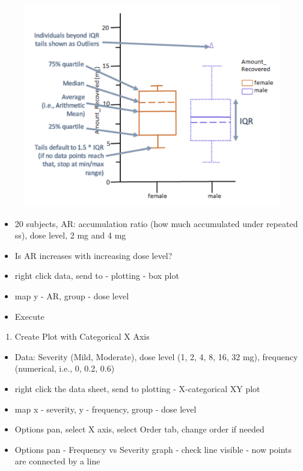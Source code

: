 \documentclass[
  letterpaper,
  DIV=11,
  numbers=noendperiod]{scrreprt}
\providecommand{\tightlist}{%
  \setlength{\itemsep}{0pt}\setlength{\parskip}{0pt}}\usepackage{longtable,booktabs,array}
\begin{document}
\begin{figure}

{\centering \includegraphics[width=4.5625in,height=\textheight]{./images/image-40592419.png}

}

\end{figure}

\begin{itemize}
\tightlist
\item
  20 subjects, AR: accumulation ratio (how much accumulated under
  repeated ss), dose level, 2 mg and 4 mg
\item
  Is AR increases with increasing dose level?
\item
  right click data, send to - plotting - box plot
\item
  map y - AR, group - dose level
\item
  Execute
\end{itemize}

\begin{enumerate}
\def\labelenumi{\arabic{enumi}.}
\setcounter{enumi}{7}
\tightlist
\item
  Create Plot with Categorical X Axis
\end{enumerate}

\begin{itemize}
\tightlist
\item
  Data: Severity (Mild, Moderate), dose level (1, 2, 4, 8, 16, 32 mg),
  frequency (numerical, i.e., 0, 0.2, 0.6)
\item
  right click the data sheet, send to plotting - X-categorical XY plot
\item
  map x - severity, y - frequency, group - dose level
\item
  Options pan, select X axis, select Order tab, change order if needed
\item
  Options pan - Frequency vs Severity graph - check line visible - now
  points are connected by a line
\end{itemize}
\end{document}

